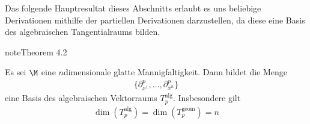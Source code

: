 \documentclass[letterpaper,10pt,german]{jupyterBook}
\begin{document}
\sphinxAtStartPar
Das folgende Hauptresultat dieses Abschnitts erlaubt es uns beliebige Derivationen mithilfe der partiellen Derivationen darzustellen, da diese eine Basis des algebraischen Tangentialraums bilden.
\label{manifolds/tangential:thm:tanbasis}
\begin{sphinxadmonition}{note}{Theorem 4.2}



\sphinxAtStartPar
Es sei \(\M\) eine \(n\)\sphinxhyphen{}dimensionale glatte Mannigfaltigkeit.
Dann bildet die Menge
\begin{equation*}
\begin{split}\{\partial_{x^1}^p,\ldots,\partial_{x^n}^p\}\end{split}
\end{equation*}
\sphinxAtStartPar
eine Basis des algebraischen Vektorraums \(T^{\text{alg}}_p\).
Insbesondere gilt
\begin{equation*}
\begin{split}\dim(T^{\text{alg}}_p)=\dim(T^{\text{geom}}_p)=n\end{split}
\end{equation*}\end{sphinxadmonition}
\end{document}
